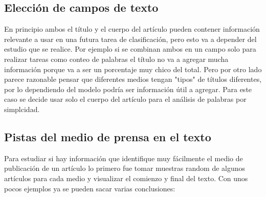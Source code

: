 \documentclass[11pt, a4paper]{article}
\begin{document}
\subsection{Elección de campos de texto}

En principio ambos el título y el cuerpo del artículo pueden contener información relevante a usar 
en una futura tarea de clasificación, pero esto va a depender del estudio que se realice. 
Por ejemplo si se combinan ambos en un campo solo para realizar tareas como conteo de 
palabras el título no va a agregar mucha información porque va a ser un porcentaje muy chico del total. 
Pero por otro lado parece razonable pensar que diferentes medios tengan "tipos" de títulos diferentes, 
por lo dependiendo del modelo podría ser información útil a agregar. Para este caso se decide usar solo 
el cuerpo del artículo para el análisis de palabras por simplcidad.

\subsection{Pistas del medio de prensa en el texto}
Para estudiar si hay información que identifique muy fácilmente el medio de publicación 
de un artículo lo primero fue tomar muestras random de algunos artículos para cada medio y
 visualizar el comienzo y final del texto. Con unos pocos ejemplos ya se pueden sacar varias conclusiones:
\end{document}

